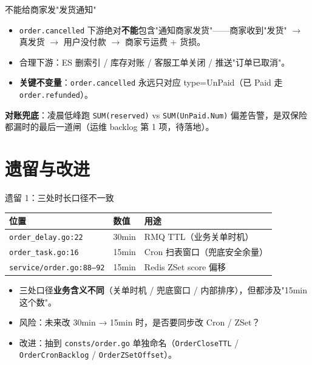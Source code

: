 \begin{frame}{不能给商家发"发货通知"}
\begin{itemize}
  \item \texttt{order.cancelled} 下游绝对\textbf{不能}包含"通知商家发货"——商家收到"发货" $\to$ 真发货 $\to$ 用户没付款 $\to$ 商家亏运费 + 货损。
  \item 合理下游：ES 删索引 / 库存对账 / 客服工单关闭 / 推送"订单已取消"。
  \item \textbf{关键不变量}：\texttt{order.cancelled} 永远只对应 type=UnPaid（已 Paid 走 \texttt{order.refunded}）。
\end{itemize}
\vspace{1mm}
\small \textbf{对账兜底}：凌晨低峰跑 \texttt{SUM(reserved)} vs \texttt{SUM(UnPaid.Num)} 偏差告警，是双保险都漏时的最后一道闸（运维 backlog 第 1 项，待落地）。
\end{frame}


\section{遗留与改进}

\begin{frame}{遗留 1：三处时长口径不一致}
{\small
\begin{tabular}{@{}lll@{}}
\toprule
位置 & 数值 & 用途 \\
\midrule
\texttt{order\_delay.go:22}      & 30min & RMQ TTL（业务关单时机）\\
\texttt{order\_task.go:16}       & 15min & Cron 扫表窗口（兜底安全余量）\\
\texttt{service/order.go:88--92} & 15min & Redis ZSet score 偏移 \\
\bottomrule
\end{tabular}
}
\vspace{2mm}
\begin{itemize}
  \item 三处口径\textbf{业务含义不同}（关单时机 / 兜底窗口 / 内部排序），但都涉及"15min 这个数"。
  \item 风险：未来改 30min → 15min 时，是否要同步改 Cron / ZSet？
  \item 改进：抽到 \texttt{consts/order.go} 单独命名（\texttt{OrderCloseTTL} / \texttt{OrderCronBacklog} / \texttt{OrderZSetOffset}）。
\end{itemize}
\end{frame}

